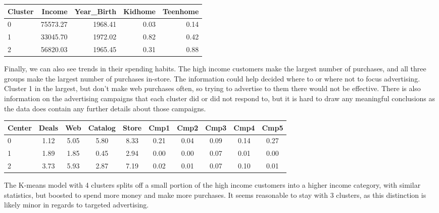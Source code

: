 \documentclass[12pt]{article}
\begin{document}
\begin{center}
    \begin{tabular}{lrrrr}
    \toprule
    Cluster &   Income &  Year\_Birth &  Kidhome &  Teenhome \\
    \midrule
    0 & 75573.27 &     1968.41 &     0.03 &      0.14 \\
    1 & 33045.70 &     1972.02 &     0.82 &      0.42 \\
    2 & 56820.03 &     1965.45 &     0.31 &      0.88 \\
    \bottomrule
    \end{tabular}
\end{center}
Finally, we can also see trends in their spending habits. The high income customers make the largest number of purchases, and all three groups make the largest number of purchases in-store. The information could help decided where to or where not to focus advertising. Cluster 1 in the largest, but don't make web purchases often, so trying to advertise to them there would not be effective. There is also information on the advertising campaigns that each cluster did or did not respond to, but it is hard to draw any meaningful conclusions as the data does contain any further details about those campaigns. 
\begin{center}
    \begin{tabular}{lccccccccc}
    \toprule
    Center &  Deals &  Web &  Catalog &  Store &  Cmp1 &  Cmp2 &  Cmp3 &  Cmp4 &  Cmp5 \\
    \midrule
    0 &               1.12 &             5.05 &                 5.80 &               8.33 &          0.21 &          0.04 &          0.09 &          0.14 &          0.27 \\
    1 &               1.89 &             1.85 &                 0.45 &               2.94 &          0.00 &          0.00 &          0.07 &          0.01 &          0.00 \\
    2 &               3.73 &             5.93 &                 2.87 &               7.19 &          0.02 &          0.01 &          0.07 &          0.10 &          0.01 \\
    \bottomrule
    \end{tabular}
\end{center}
The K-means model with 4 clusters splits off a small portion of the high income customers into a higher income category, with similar statistics, but boosted to spend more money and make more purchases. It seems reasonable to stay with 3 clusters, as this distinction is likely minor in regards to targeted advertising.
\end{document}
